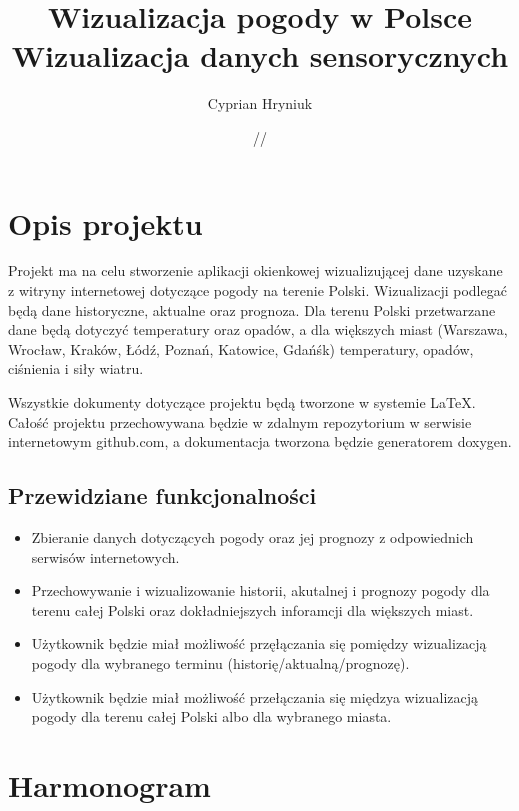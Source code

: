 \documentclass[10pt, a4paper]{article}
\title{\vspace{175pt}\textbf{Wizualizacja pogody w Polsce\\}  \small{\vspace{10pt}Wizualizacja danych sensorycznych}}
\author{Cyprian Hryniuk}
\date{\oldstylenums{20}/\oldstylenums{03}/\oldstylenums{19}}
\begin{document}
\begin{titlepage}
\maketitle
\thispagestyle{empty}
\end{titlepage}

\newpage
\tableofcontents
\newpage
\section{Opis projektu}
\label{sec:opisprojektu}
\indent

Projekt ma na celu stworzenie aplikacji okienkowej wizualizującej dane uzyskane z witryny internetowej dotyczące pogody na terenie Polski. Wizualizacji podlegać będą dane historyczne, aktualne oraz prognoza. Dla terenu Polski przetwarzane dane będą dotyczyć temperatury oraz opadów, a dla większych miast (Warszawa, Wrocław, Kraków, Łódź, Poznań, Katowice, Gdańśk) temperatury, opadów, ciśnienia i siły wiatru. 

Wszystkie dokumenty dotyczące projektu będą tworzone w systemie \LaTeX. Całość projektu przechowywana będzie w zdalnym repozytorium w serwisie internetowym github.com, a dokumentacja tworzona będzie generatorem doxygen. 

\subsection{Przewidziane funkcjonalności}
\label{ssec:funkc}
\begin{itemize}
  \item Zbieranie danych dotyczących pogody oraz jej prognozy z odpowiednich serwisów internetowych.
  \item Przechowywanie i wizualizowanie historii, akutalnej i prognozy pogody dla terenu całej Polski oraz dokładniejszych inforamcji dla większych miast.
  \item Użytkownik będzie miał możliwość przęłączania się pomiędzy wizualizacją pogody dla wybranego terminu (historię/aktualną/prognozę). 
  \item Użytkownik będzie miał możliwość przełączania się międzya wizualizacją pogody dla terenu całej Polski albo dla wybranego miasta.
  
\end{itemize}

\section{Harmonogram}
\label{sec:harmonogram}
\end{document}
